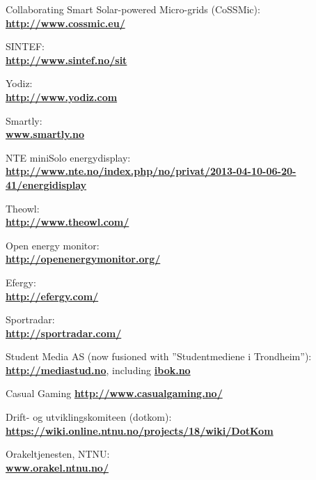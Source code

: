 \begin{thebibliography}{1}

 Collaborating Smart Solar-powered Micro-grids (CoSSMic):\\ \textbf{\url{http://www.cossmic.eu/}}

 SINTEF: \\
\textbf{ \url{ http://www.sintef.no/sit}}

 Yodiz: \\
\textbf{ \url{ http://www.yodiz.com}}
        
 Smartly: \\
\textbf{ \url{www.smartly.no}}

 NTE miniSolo energydisplay:\\
\textbf{ \url{http://www.nte.no/index.php/no/privat/2013-04-10-06-20-41/energidisplay}}

 Theowl:\\
\textbf{ \url{http://www.theowl.com/}}

 Open energy monitor:\\
\textbf{ \url{http://openenergymonitor.org/}}

 Efergy:\\
\textbf{ \url{http://efergy.com/}}

 Sportradar:\\
\textbf{ \url{http://sportradar.com/}}

 Student Media AS (now fusioned with ''Studentmediene i Trondheim''):\\
\textbf{ \url{http://mediastud.no}}, including \textbf{ \url{ibok.no}}

 Casual Gaming
\textbf{ \url{http://www.casualgaming.no/}}

 Drift- og utviklingskomiteen (dotkom):\\
\textbf{ \url{https://wiki.online.ntnu.no/projects/18/wiki/DotKom}}

 Orakeltjenesten, NTNU:\\
\textbf{ \url{www.orakel.ntnu.no/‎}}


\end{thebibliography}

